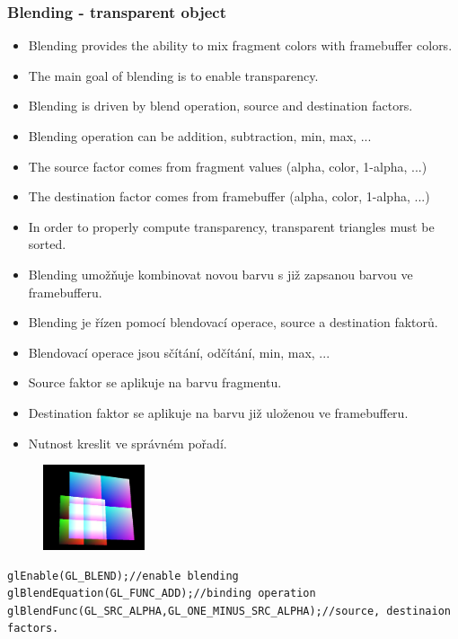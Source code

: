 \begin{frame}[fragile]\frametitle{Blending - transparent object}\scriptsize
  \begin{itemize}
  \item Blending provides the ability to mix fragment colors with framebuffer colors.
  \item The main goal of blending is to enable transparency.
  \item Blending is driven by blend operation, source and destination factors.
  \item Blending operation can be addition, subtraction, min, max, ...
  \item The source factor comes from fragment values (alpha, color, 1-alpha, ...)
  \item The destination factor comes from framebuffer (alpha, color, 1-alpha, ...)
  \item In order to properly compute transparency, transparent triangles must be sorted.
  \end{itemize}
  \begin{itemize}
  \item Blending umožňuje kombinovat novou barvu s již zapsanou barvou ve framebufferu.
  \item Blending je řízen pomocí blendovací operace, source a destination faktorů.
  \item Blendovací operace jsou sčítání, odčítání, min, max, ...
  \item Source faktor se aplikuje na barvu fragmentu.
  \item Destination faktor se aplikuje na barvu již uloženou ve framebufferu.
  \item Nutnost kreslit ve správném pořadí.
  \end{itemize}
  \begin{figure}[h]
  \includegraphics[width=3cm,keepaspectratio]{pics/pfo/blending.jpg}
  \end{figure}
  {\scriptsize
\begin{verbatim}
glEnable(GL_BLEND);//enable blending
glBlendEquation(GL_FUNC_ADD);//binding operation
glBlendFunc(GL_SRC_ALPHA,GL_ONE_MINUS_SRC_ALPHA);//source, destinaion factors.
  \end{verbatim}
  }
\end{frame}

